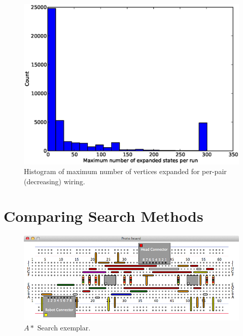 \begin{figure}[H]
\begin{center}
\includegraphics[width=\textwidth]{Images/max_expanded_per_pair_decreasing.eps}
\caption{Histogram of maximum number of vertices expanded for per-pair
(decreasing) wiring.}
\label{fig:max_expanded_per_pair_decreasing}
\end{center}
\end{figure}

\section{Comparing Search Methods}

\begin{figure}[H]
\begin{center}
\includegraphics[width=\textwidth]{Images/exemplar_per_pair_decreasing.png}
\caption{$A*$ Search exemplar.}
\end{center}
\end{figure}

